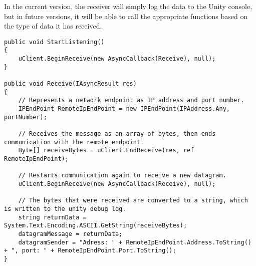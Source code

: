 In the current version, the receiver will simply log the data to the Unity console, but in future versions, it will be able to call the appropriate functions based on the type of data it has received.


\begin{lstlisting}[caption={Receiving data from host},language=CSharp,label={lst:receivedata}]
public void StartListening()
{
    uClient.BeginReceive(new AsyncCallback(Receive), null);
}

public void Receive(IAsyncResult res)
{
    // Represents a network endpoint as IP address and port number.
    IPEndPoint RemoteIpEndPoint = new IPEndPoint(IPAddress.Any, portNumber);

    // Receives the message as an array of bytes, then ends communication with the remote endpoint.
    Byte[] receiveBytes = uClient.EndReceive(res, ref RemoteIpEndPoint);

    // Restarts communication again to receive a new datagram.
    uClient.BeginReceive(new AsyncCallback(Receive), null);

    // The bytes that were received are converted to a string, which is written to the unity debug log.
    string returnData = System.Text.Encoding.ASCII.GetString(receiveBytes);
    datagramMessage = returnData;
    datagramSender = "Adress: " + RemoteIpEndPoint.Address.ToString() + ", port: " + RemoteIpEndPoint.Port.ToString();
}
\end{lstlisting}